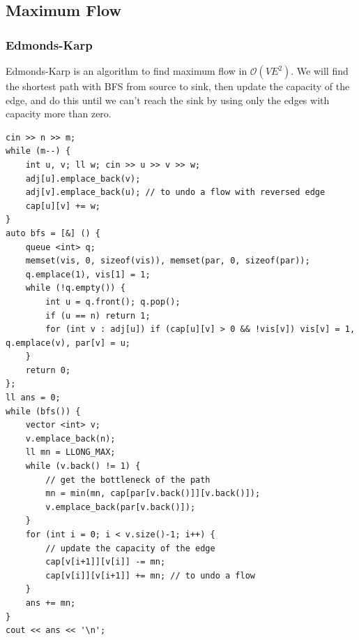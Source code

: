 \subsection{Maximum Flow}

\subsubsection{Edmonds-Karp}

Edmonds-Karp is an algorithm to find maximum flow in $\mathcal{O}(VE^2)$. We will find the shortest path with BFS from source to sink, then update the capacity of the edge, and do this until we can't reach the sink by using only the edges with capacity more than zero.

\begin{lstlisting}
cin >> n >> m;
while (m--) {
    int u, v; ll w; cin >> u >> v >> w;
    adj[u].emplace_back(v);
    adj[v].emplace_back(u); // to undo a flow with reversed edge
    cap[u][v] += w;
}
auto bfs = [&] () {
    queue <int> q;
    memset(vis, 0, sizeof(vis)), memset(par, 0, sizeof(par));
    q.emplace(1), vis[1] = 1;
    while (!q.empty()) {
        int u = q.front(); q.pop();
        if (u == n) return 1;
        for (int v : adj[u]) if (cap[u][v] > 0 && !vis[v]) vis[v] = 1, q.emplace(v), par[v] = u;
    }
    return 0;
};
ll ans = 0;
while (bfs()) {
    vector <int> v;
    v.emplace_back(n);
    ll mn = LLONG_MAX;
    while (v.back() != 1) {
        // get the bottleneck of the path
        mn = min(mn, cap[par[v.back()]][v.back()]);
        v.emplace_back(par[v.back()]);
    }
    for (int i = 0; i < v.size()-1; i++) {
        // update the capacity of the edge
        cap[v[i+1]][v[i]] -= mn;
        cap[v[i]][v[i+1]] += mn; // to undo a flow
    }
    ans += mn;
}
cout << ans << '\n';
\end{lstlisting}

\break